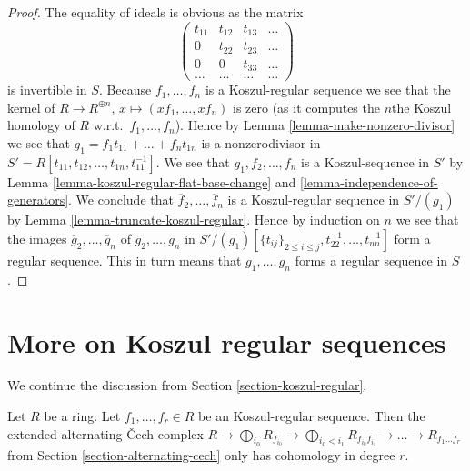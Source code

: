 \begin{proof}
The equality of ideals is obvious as the matrix
$$
\left(
\begin{matrix}
t_{11} & t_{12} & t_{13} & \ldots \\
0 & t_{22} & t_{23} & \ldots \\
0 & 0 & t_{33} & \ldots \\
\ldots & \ldots & \ldots & \ldots
\end{matrix}
\right)
$$
is invertible in $S$.
Because $f_1, \ldots, f_n$ is a Koszul-regular sequence we see that
the kernel of
$R \to R^{\oplus n}$, $x \mapsto (xf_1, \ldots, xf_n)$ is zero (as it
computes the $n$the Koszul homology of $R$ w.r.t.\ $f_1, \ldots, f_n$).
Hence by
Lemma \ref{lemma-make-nonzero-divisor}
we see that $g_1 = f_1 t_{11} + \ldots + f_n t_{1n}$ is a nonzerodivisor
in $S' = R[t_{11}, t_{12}, \ldots, t_{1n}, t_{11}^{-1}]$. We see that
$g_1, f_2, \ldots, f_n$ is a Koszul-sequence in $S'$ by
Lemma \ref{lemma-koszul-regular-flat-base-change} and
\ref{lemma-independence-of-generators}.
We conclude that
$\overline{f}_2, \ldots, \overline{f}_n$ is a Koszul-regular sequence
in $S'/(g_1)$ by
Lemma \ref{lemma-truncate-koszul-regular}.
Hence by induction on $n$ we see that the images
$\overline{g}_2, \ldots, \overline{g}_n$ of $g_2, \ldots, g_n$ in
$S'/(g_1)[\{t_{ij}\}_{2 \leq i \leq j}, t_{22}^{-1}, \ldots, t_{nn}^{-1}]$
form a regular sequence. This in turn means that
$g_1, \ldots, g_n$ forms a regular sequence in $S$.
\end{proof}







\section{More on Koszul regular sequences}
\label{section-more-koszul-regular}

\noindent
We continue the discussion from Section \ref{section-koszul-regular}.

\begin{lemma}
\label{lemma-vanishing-extended-alternating-koszul}
Let $R$ be a ring. Let $f_1, \ldots, f_r \in R$ be an
Koszul-regular sequence. Then the extended alternating
{\v C}ech complex $R \to \bigoplus\nolimits_{i_0} R_{f_{i_0}} \to
\bigoplus\nolimits_{i_0 < i_1} R_{f_{i_0}f_{i_1}} \to
\ldots \to R_{f_1\ldots f_r}$ from Section \ref{section-alternating-cech}
only has cohomology in degree $r$.
\end{lemma}

